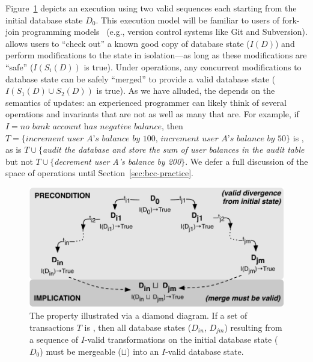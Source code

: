 Figure~\ref{fig:iconfluence} depicts an \iconfluent execution using
two valid sequences each starting from the initial database state
$D_0$. This execution model will be familiar to users of fork-join
programming models~\cite{hewitt-forkjoin} (e.g., version control
systems like Git and Subversion). \iconfluence allows users to ``check
out'' a known good copy of database state ($I(D)$) and perform
modifications to the state in isolation---as long as these
modifications are ``safe'' ($I(S_i(D))$ is true). Under \iconfluent
operations, any concurrent modifications to database state can be
safely ``merged'' to provide a valid database state ($I(S_1(D) \cup
S_2(D))$ is true). As we have alluded, the \iconfluence depends on the
semantics of updates: an experienced programmer can likely think of
several operations and invariants that are not \iconfluent as well as
many that are. For example, if $I=\textit{no bank account has negative
  balance}$, then $T=\{\textit{increment user A's balance by 100,
  increment user A's balance by 50}\}$ is \iconfluent, as is
$T\cup\{$\textit{audit the database and store the sum of user balances
  in the \textrm{audit} table} but not $T\cup\{$\textit{decrement user
  A's balance by 200}$\}$. We defer a full discussion of the space of
operations until Section~\ref{sec:bcc-practice}.

\begin{figure}
\begin{center}
\includegraphics[width=\columnwidth]{figs/icommute.pdf}\vspace{-1em}
\end{center}
\caption{The \iconfluence property illustrated via a diamond
  diagram. If a set of transactions $T$ is \iconfluent, then all
  database states ($D_{in}$, $D_{jm}$) resulting from a sequence of
  $I$-valid transformations on the initial database state ($D_0$) must
  be mergeable ($\sqcup$) into an $I$-valid database state.}
\label{fig:iconfluence}
\end{figure}

